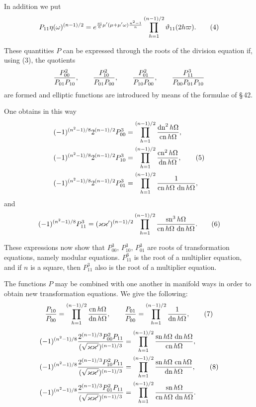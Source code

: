 \documentclass[11pt]{article}
\providecommand{\sn}{\operatorname{sn}}
\providecommand{\cn}{\operatorname{cn}}
\providecommand{\dn}{\operatorname{dn}}
\providecommand{\ii}{\mathrm{i}}
\begin{document}
In addition we put
\begin{equation}
P_{11}\eta(\omega)^{(n-1)/2}=e^{{\pi\ii\over6}\mu'(\mu+\mu'\omega){n^2-1\over n}}
\prod_{h=1}^{(n-1)/2}\vartheta_{11}(2h\varpi).
\tag{4}
\end{equation}

These quantities $P$ can be expressed through the roots of the division equation if, using (3), the quotients
\[
{P_{00}^2\over P_{01}P_{10}},\qquad
{P_{10}^2\over P_{01}P_{00}},\qquad
{P_{01}^2\over P_{10}P_{00}},\qquad
{P_{11}^3\over P_{00}P_{01}P_{10}}
\]
are formed and elliptic functions are introduced by means of the formulae of \S\,42.

One obtains in this way
\begin{align}
(-1)^{(n^2-1)/8}2^{(n-1)/2}P_{00}^{3}
&=\prod_{h=1}^{(n-1)/2}{\dn^2 h\Omega\over \cn h\Omega},\notag\\
(-1)^{(n^2-1)/8}2^{(n-1)/2}P_{10}^{3}
&=\prod_{h=1}^{(n-1)/2}{\cn^2 h\Omega\over \dn h\Omega},\tag{5}\\
(-1)^{(n^2-1)/8}2^{(n-1)/2}P_{01}^{3}
&=\prod_{h=1}^{(n-1)/2}{1\over \cn h\Omega\,\dn h\Omega},\notag
\end{align}
and
\begin{equation}
(-1)^{(n^2-1)/8}P_{11}^{3}=(\varkappa\varkappa')^{(n-1)/2}
\prod_{h=1}^{(n-1)/2}{\sn^{3}h\Omega\over \cn h\Omega\,\dn h\Omega}.
\tag{6}
\end{equation}

These expressions now show that $P_{00}^{3}$, $P_{10}^{3}$, $P_{01}^{3}$ are roots of transformation equations, namely modular equations. $P_{11}^{6}$ is the root of a multiplier equation, and if $n$ is a square, then $P_{11}^{3}$ also is the root of a multiplier equation.

The functions $P$ may be combined with one another in manifold ways in order to obtain new transformation equations. We give the following:
\begin{equation}
{P_{10}\over P_{00}}=
\prod_{h=1}^{(n-1)/2}{\cn h\Omega\over \dn h\Omega},
\qquad
{P_{01}\over P_{00}}=
\prod_{h=1}^{(n-1)/2}{1\over \dn h\Omega},
\tag{7}
\end{equation}
\begin{align}
(-1)^{(n^2-1)/8}{2^{(n-1)/3}P_{00}^{2}P_{11}\over (\sqrt{\varkappa\varkappa'})^{(n-1)/3}}
&=\prod_{h=1}^{(n-1)/2}{\sn h\Omega\,\dn h\Omega\over\cn h\Omega},\notag\\
(-1)^{(n^2-1)/8}{2^{(n-1)/3}P_{10}^{2}P_{11}\over (\sqrt{\varkappa\varkappa'})^{(n-1)/3}}
&=\prod_{h=1}^{(n-1)/2}{\sn h\Omega\,\cn h\Omega\over\dn h\Omega},\tag{8}\\
(-1)^{(n^2-1)/8}{2^{(n-1)/3}P_{01}^{2}P_{11}\over (\sqrt{\varkappa\varkappa'})^{(n-1)/3}}
&=\prod_{h=1}^{(n-1)/2}{\sn h\Omega\over\cn h\Omega\,\dn h\Omega}.
\notag
\end{align}
\end{document}
